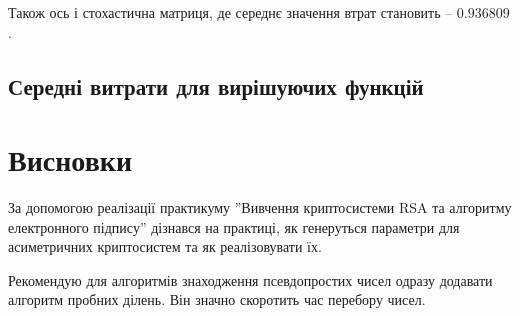 Також ось і стохастична матриця, де середнє значення втрат становить -- $0.936809$.


\subsection{Середні витрати для вирішуючих функцій}

\section{Висновки}
За допомогою реалізації практикуму ''Вивчення криптосистеми RSA та алгоритму електронного
підпису'' дізнався на практиці, як генеруться параметри для асиметричних криптосистем та як реалізовувати їх. 

Рекомендую для алгоритмів знаходження псевдопростих чисел одразу додавати алгоритм пробних ділень. Він значно скоротить час перебору чисел.

		

	




